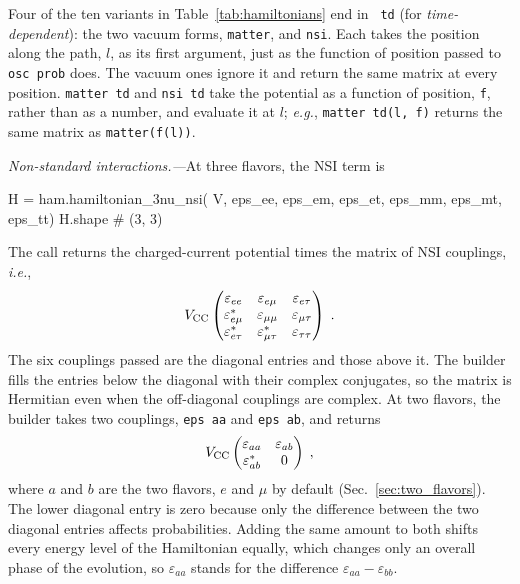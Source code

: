 \documentclass[final,5p,times,twocolumn,sort,compress]{elsarticle}
\makeatletter
\newcommand{\ie}{{\it i.e.}}
\newcommand{\eg}{{\it e.g.}}
\DeclareRobustCommand{\_}{%
  \ifmmode\nfss@text{\textunderscore}\else\textunderscore\allowbreak\fi}
\newcommand{\Tab}{Table}
\newcommand{\tabl}[1]{\Tab~\ref{tab:#1}}
\makeatother
\begin{document}
Four of the ten variants in \tabl{hamiltonians} end in {\tt \_td} (for \textit{time-dependent}): the two vacuum forms, {\tt matter}, and {\tt nsi}. Each takes the position along the path, $l$, as its first argument, just as the function of position passed to {\tt osc\_prob} does. The vacuum ones ignore it and return the same matrix at every position. {\tt matter\_td} and {\tt nsi\_td} take the potential as a function of position, {\tt f}, rather than as a number, and evaluate it at $l$; \eg, {\tt matter\_td(l, f)} returns the same matrix as {\tt matter(f(l))}.

\smallskip

\textit{Non-standard interactions.---}At three flavors, the NSI term is
\begin{pysnip}
H = ham.hamiltonian_3nu_nsi(
    V, eps_ee, eps_em, eps_et,
    eps_mm, eps_mt, eps_tt)
H.shape                        # (3, 3)
\end{pysnip}
The call returns the charged-current potential times the matrix of NSI couplings, \ie,
\begin{equation}
 \label{equ:h_nsi_3nu}
 V_{\rm CC}
 \begin{pmatrix}
  \varepsilon_{ee} & \varepsilon_{e\mu} & \varepsilon_{e\tau} \\
  \varepsilon_{e\mu}^\ast & \varepsilon_{\mu\mu} & \varepsilon_{\mu\tau} \\
  \varepsilon_{e\tau}^\ast & \varepsilon_{\mu\tau}^\ast & \varepsilon_{\tau\tau}
 \end{pmatrix} \;.
\end{equation}
The six couplings passed are the diagonal entries and those above it. The builder fills the entries below the diagonal with their complex conjugates, so the matrix is Hermitian even when the off-diagonal couplings are complex. At two flavors, the builder takes two couplings, {\tt eps\_aa} and {\tt eps\_ab}, and returns
\begin{equation}
 \label{equ:h_nsi_2nu}
 V_{\rm CC}
 \begin{pmatrix}
  \varepsilon_{aa} & \varepsilon_{ab} \\
  \varepsilon_{ab}^\ast & 0
 \end{pmatrix} \;,
\end{equation}
where $a$ and $b$ are the two flavors, $e$ and $\mu$ by default (Sec.~\ref{sec:two_flavors}). The lower diagonal entry is zero because only the difference between the two diagonal entries affects probabilities. Adding the same amount to both shifts every energy level of the Hamiltonian equally, which changes only an overall phase of the evolution, so $\varepsilon_{aa}$ stands for the difference $\varepsilon_{aa} - \varepsilon_{bb}$.
\end{document}
